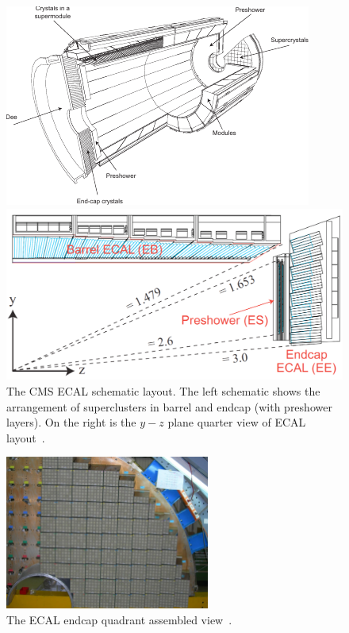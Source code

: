 \begin{figure}[!ht]
  \centering
  \begin{minipage}[c]{.60\textwidth}
    \includegraphics[width=\textwidth]{figures/cms_ecal_schematic.pdf}
  \end{minipage}
  \begin{minipage}[c]{.38\textwidth}
    \includegraphics[width=\textwidth]{figures/cms_ecal_layout.png}
  \end{minipage}
  \caption[The CMS \gls{ECAL} schematic layout]%
  {The \gls{CMS} \gls{ECAL} schematic layout. The left schematic shows the arrangement of
    superclusters in barrel and endcap (with preshower layers). On the right is the \(y-z \)
    plane quarter view of \gls{ECAL} layout~\cite{image-cms-ecal-layout}.}%
  \label{fig:cms-ecal-schematic}
\end{figure}

\begin{figure}[!ht]
  \centering
  \includegraphics[width=0.60\textwidth]{figures/cms_ecal_ee_quadrant.jpg}
  \caption[The \gls{ECAL} endcap quadrant assembled view]%
  {The \gls{ECAL} endcap quadrant assembled view~\cite{image-cms-ecal-ee-quadrant}.}%
  \label{fig:cms-ecal-ee}
\end{figure}


